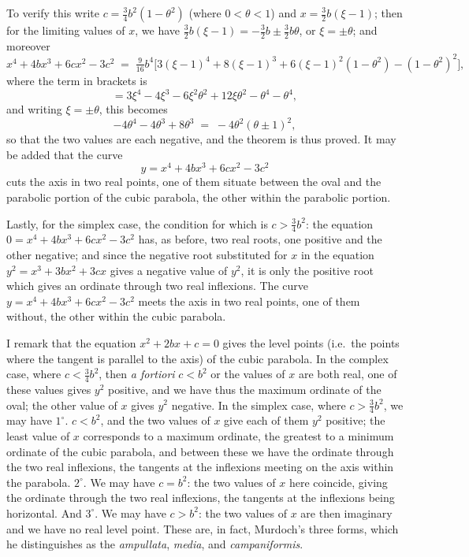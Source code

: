 \documentclass[11pt,a4paper]{article}
\begin{document}
\medskip

To verify this write $c = \tfrac{3}{4}b^2(1 - \theta^2)$ (where $0 < \theta < 1$) and $x = \tfrac{3}{2}b(\xi - 1)$; then for the limiting values of $x$, we have $\tfrac{3}{2}b(\xi - 1) = -\tfrac{3}{2}b \pm \tfrac{3}{2}b\theta$, or $\xi = \pm \theta$; and moreover
\[
x^4 + 4bx^3 + 6cx^2 - 3c^2 \;=\; \tfrac{9}{16}b^4\bigl[3(\xi-1)^4 + 8(\xi-1)^3 + 6(\xi-1)^2(1 - \theta^2) - (1 - \theta^2)^2\bigr],
\]
where the term in brackets is
\[
= 3\xi^4 - 4\xi^3 - 6\xi^2\theta^2 + 12\xi\theta^2 - \theta^4 - \theta^4,
\]
and writing $\xi = \pm \theta$, this becomes
\[
- 4\theta^4 - 4\theta^3 + 8\theta^3 \;=\; -4\theta^2(\theta \pm 1)^2,
\]
so that the two values are each negative, and the theorem is thus proved. It may be added that the curve
\[
y = x^4 + 4bx^3 + 6cx^2 - 3c^2
\]
cuts the axis in two real points, one of them situate between the oval and the parabolic portion of the cubic parabola, the other within the parabolic portion.

\medskip

Lastly, for the simplex case, the condition for which is $c > \tfrac{3}{4}b^2$: the equation $0 = x^4 + 4bx^3 + 6cx^2 - 3c^2$ has, as before, two real roots, one positive and the other negative; and since the negative root substituted for $x$ in the equation $y^2 = x^3 + 3bx^2 + 3cx$ gives a negative value of $y^2$, it is only the positive root which gives an ordinate through two real inflexions. The curve $y = x^4 + 4bx^3 + 6cx^2 - 3c^2$ meets the axis in two real points, one of them without, the other within the cubic parabola.

\medskip

I remark that the equation $x^2 + 2bx + c = 0$ gives the level points (i.e.\ the points where the tangent is parallel to the axis) of the cubic parabola. In the complex case, where $c < \tfrac{3}{4}b^2$, then \textit{a fortiori} $c < b^2$ or the values of $x$ are both real, one of these values gives $y^2$ positive, and we have thus the maximum ordinate of the oval; the other value of $x$ gives $y^2$ negative. In the simplex case, where $c > \tfrac{3}{4}b^2$, we may have $1^\circ.$ $c < b^2$, and the two values of $x$ give each of them $y^2$ positive; the least value of $x$ corresponds to a maximum ordinate, the greatest to a minimum ordinate of the cubic parabola, and between these we have the ordinate through the two real inflexions, the tangents at the inflexions meeting on the axis within the parabola. $2^\circ.$ We may have $c = b^2$: the two values of $x$ here coincide, giving the ordinate through the two real inflexions, the tangents at the inflexions being horizontal. And $3^\circ.$ We may have $c > b^2$: the two values of $x$ are then imaginary and we have no real level point. These are, in fact, Murdoch's three forms, which he distinguishes as the \emph{ampullata}, \emph{media}, and \emph{campaniformis}.
\end{document}
